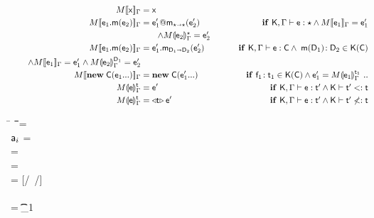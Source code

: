 \documentclass[sigconf]{acmart}
\begin{document}
\begin{figure*}[!h]
\begin{mathpar}


\end{mathpar}

\begin{minipage}{0.32\textwidth}
\begin{align*}
\TRG[M]{\x}\Env &= \x & \\
\TRG[M]{\Call{\e_1}\m{{\e_2}}}\Env &= \DynCall{\ep_1}\m{\ep_2} & \tag*{\IF\EM{\TypeCk{\K,\Env}\e\any
\AND \TRG[M]{\e_1}\Env = \ep_1}} \\ &\tag*{\EM{\wedge \TAG[M]{\e_2}\Env{\any} = \ep_2}}\\
\TRG[M]{\Call{\e_1}\m{{\e_2}}}\Env &= \KCall{\ep_1}\m{\ep_2}{\D[1]}{\D[2]} & \tag*{\IF\EM{\TypeCk{\K,\Env}\e\C
\AND\; \Mtype\m{\D[1]}{\D[2]}\In\App\K\C}}\\
\tag*{\EM{\AND \TRG[M]{\e_1}\Env = \ep_1 \wedge \TAG[M]{\e_2}\Env{\D[1]} = \ep_2}}\\
\TRG[M]{\New\C{{\e_1}...}}\Env &= \New\C{\ep_1...} & \tag*{\IF\EM{\Ftype{\f[1]}{\t[1]}\In\App\K\C
    \AND \ep[1] = \TAG[M]{\e[1]}\Env{\t[1]} ~..}}\\
\TAG[M]{\e}{\Env}\t &= \e' & \tag*{\IF\EM{\TypeCk{\K,\Env}\e\tp \AND \K\vdash\tp\Sub\t}}\\
\TAG[M]{\e}{\Env}\t &= \MonCast{\t}{\ep} & \tag*{\IF\EM{\TypeCk{\K,\Env}\e\tp \AND \K\vdash\tp\not\Sub\t}}
\end{align*}
\end{minipage}\hspace{1cm}
\begin{minipage}{0.45\textwidth}
\begin{tabbing}
  \K\HS \New{} \HS\= \s~ \HS \=\Red\HS \= \K \HS\= \ap \HS\= \sp\HS \= \WHERE\HS\= \fresh\ap \HS\HS\HS\HS\HS\HS\HS\=  \sp = {\Map{}}
\\
\K\HS \FReadR\a{\f[i]} \> \s           \>\Red\>     \K \>$\a[i]$ \> \s  \> \WHERE \>\App\s\a=\obj\C{\a[1],\ldots\a[i],\a[n]\ldots}
\\
\K\HS {\FWriteR\a{\f[i]}\ap} \> \s     \>\Red\>     \K \> \ap \> \sp \>  \WHERE \>\App\s\a=\obj\C{\a[1],\ldots\a[i],\a[n]\ldots} \HS  
\\ \> \> \> \> \> \> \> \sp = \Map\s{\Bind\a{\obj\C{\a[1],\ldots\ap,\a[n]\ldots}}}
\\
\K\HS{\KCall\a\m\ap\t\tp} \> \s      \>\Red\>     \K \>  \ep \> \s \> \WHERE\> \ep = {[\a/\this~{\ap/\x}]\e} \HS \\ \> \> \> \> \> \> \> \Mdef\m{}\e\In \App\K\C  \\ \> \> \> \> \> \> \>  \App\s\a=\obj{} \> \StrSub {\emptyset}\K\t {\t_{1}} \\ 

\end{tabbing}
\end{minipage}
\end{figure*}
\end{document}
